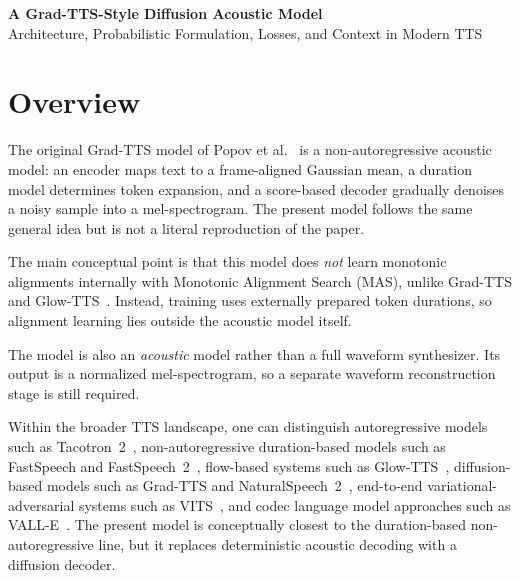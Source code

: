 \documentclass[11pt,a4paper]{article}
\begin{document}
\begin{center}
{\Large\bfseries A Grad-TTS-Style Diffusion Acoustic Model}\\[0.5em]
{\large Architecture, Probabilistic Formulation, Losses, and Context in Modern TTS}
\end{center}

\begin{abstract}
This note describes a compact Grad-TTS-style acoustic model for text-to-mel synthesis. The model is non-autoregressive: text is encoded in parallel, durations determine frame expansion, a conditional prior predicts a coarse mel representation, and a diffusion decoder refines this prior into the final mel-spectrogram. Relative to the original Grad-TTS formulation, the present model differs in three main ways: alignment supervision is provided externally rather than learned by monotonic alignment search, the mel prior is produced by a separate prior network, and diffusion training includes an auxiliary clean reconstruction term.
\end{abstract}

\section{Overview}

The original Grad-TTS model of Popov et al.~\cite{popov2021gradtts} is a non-autoregressive acoustic model: an encoder maps text to a frame-aligned Gaussian mean, a duration model determines token expansion, and a score-based decoder gradually denoises a noisy sample into a mel-spectrogram. The present model follows the same general idea but is not a literal reproduction of the paper.

The main conceptual point is that this model does \emph{not} learn monotonic alignments internally with Monotonic Alignment Search (MAS), unlike Grad-TTS and Glow-TTS~\cite{kim2020glowtts,popov2021gradtts}. Instead, training uses externally prepared token durations, so alignment learning lies outside the acoustic model itself.

The model is also an \emph{acoustic} model rather than a full waveform synthesizer. Its output is a normalized mel-spectrogram, so a separate waveform reconstruction stage is still required.

Within the broader TTS landscape, one can distinguish autoregressive models such as Tacotron~2~\cite{shen2018naturaltts}, non-autoregressive duration-based models such as FastSpeech and FastSpeech~2~\cite{ren2019fastspeech,ren2020fastspeech2}, flow-based systems such as Glow-TTS~\cite{kim2020glowtts}, diffusion-based models such as Grad-TTS and NaturalSpeech~2~\cite{popov2021gradtts,shen2023naturalspeech2}, end-to-end variational-adversarial systems such as VITS~\cite{kim2021vits}, and codec language model approaches such as VALL-E~\cite{wang2023valle}. The present model is conceptually closest to the duration-based non-autoregressive line, but it replaces deterministic acoustic decoding with a diffusion decoder.
\end{document}
